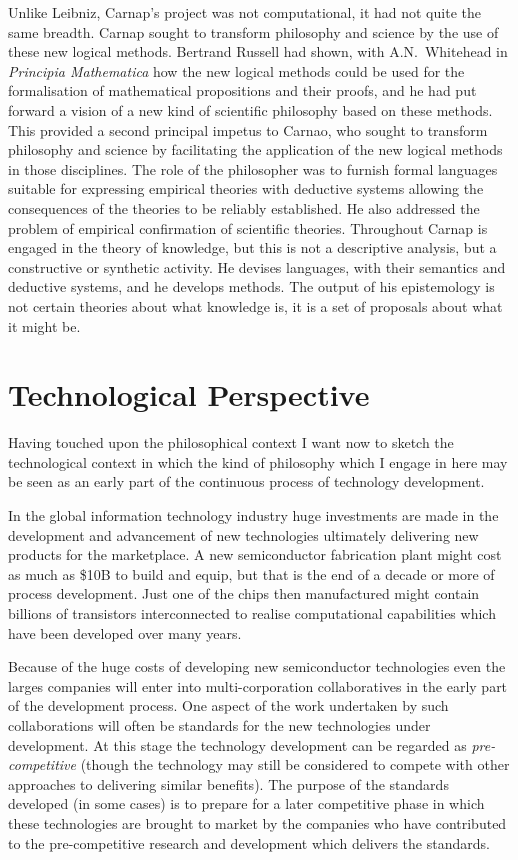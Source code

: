 Unlike Leibniz, Carnap's project was not computational, it had not quite the same breadth.
Carnap sought to transform philosophy and science by the use of these new logical
methods.
Bertrand Russell had shown, with A.N.~Whitehead in {\it Principia Mathematica}\cite{russell1913}
how the new logical methods could be used for the formalisation of mathematical propositions and
their proofs, and he had put forward a vision of a new kind of scientific philosophy
based on these methods.
This provided a second principal impetus to Carnao, who sought to transform philosophy
and science by facilitating the application of the new logical methods in those disciplines.
The role of the philosopher was to furnish formal languages suitable for expressing
empirical theories with deductive systems allowing the consequences of the theories
to be reliably established.
He also addressed the problem of empirical confirmation of scientific theories.
Throughout Carnap is engaged in the theory of knowledge, but this is not a descriptive
analysis, but a constructive or synthetic activity.
He devises languages, with their semantics and deductive systems, and he develops
methods.
The output of his epistemology is not certain theories about what knowledge is, it
is a set of proposals about what it might be.

\section{Technological Perspective}

Having touched upon the philosophical context I want now to sketch the technological context
in which the kind of philosophy which I engage in here may be seen as an early part of
the continuous process of technology development.

In the global information technology industry huge investments are made in the development
and advancement of new technologies ultimately delivering new products for the marketplace.
A new semiconductor fabrication plant might cost as much as \$10B to build and equip, but that
is the end of a decade or more of process development.
Just one of the chips then manufactured might contain billions of transistors interconnected
to realise computational capabilities which have been developed over many years.

Because of the huge costs of developing new semiconductor technologies even the larges companies
will enter into multi-corporation collaboratives in the early part of the development process.
One aspect of the work undertaken by such collaborations will often be standards for the new
technologies under development.
At this stage the technology development can be regarded as {\it pre-competitive}
(though the technology may still be considered to compete with other approaches to delivering
similar benefits).
The purpose of the standards developed (in some cases) is to prepare for a later competitive phase
in which these technologies are brought to market by the companies who have contributed to the
pre-competitive research and development which delivers the standards.

